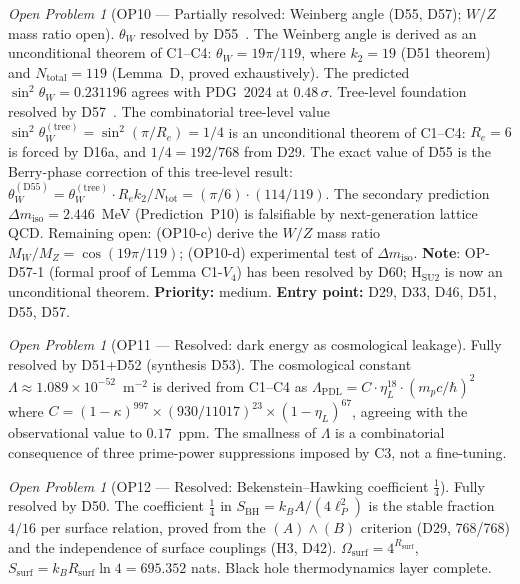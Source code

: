 \documentclass[11pt,a4paper]{article}
\theoremstyle{plain}
\theoremstyle{definition}
\theoremstyle{remark}
\newtheorem{openproblem}[theorem]{Open Problem}
\newcommand{\Rsurf}{R_{\mathrm{surf}}}
\newcommand{\SBH}{S_{\mathrm{BH}}}
\begin{document}
\begin{openproblem}[OP10 --- Partially resolved: Weinberg angle (D55, D57); $W/Z$ mass ratio open]
\label{op:weak}
\textcolor{proofblue}{$\theta_W$ resolved by D55~\cite{D55}.} The Weinberg angle is derived as an unconditional theorem of C1--C4: $\theta_W = 19\pi/119$, where $k_2 = 19$ (D51 theorem) and $N_{\mathrm{total}} = 119$ (Lemma~D, proved exhaustively). The predicted $\sin^2\theta_W = 0.231196$ agrees with PDG~2024 at $0.48\,\sigma$. \textcolor{proofblue}{Tree-level foundation resolved by D57~\cite{D57}.} The combinatorial tree-level value $\sin^2\theta_W^{(\mathrm{tree})} = \sin^2(\pi/R_e) = 1/4$ is an unconditional theorem of C1--C4: $R_e = 6$ is forced by D16a, and $1/4 = 192/768$ from D29. The exact value of D55 is the Berry-phase correction of this tree-level result: $\theta_W^{(\mathrm{D55})} = \theta_W^{(\mathrm{tree})} \cdot R_e k_2/N_{\mathrm{tot}} = (\pi/6)\cdot(114/119)$. The secondary prediction $\Delta m_{\mathrm{iso}} = 2.446$~MeV (Prediction~P10) is falsifiable by next-generation lattice QCD. Remaining open: (OP10-c) derive the $W/Z$ mass ratio $M_W/M_Z = \cos(19\pi/119)$; (OP10-d) experimental test of $\Delta m_{\mathrm{iso}}$. \textbf{Note}: OP-D57-1 (formal proof of Lemma C1-$V_4$) has been resolved by D60; H$_{\mathrm{SU2}}$ is now an unconditional theorem. \textbf{Priority:} medium. \textbf{Entry point:} D29, D33, D46, D51, D55, D57.
\end{openproblem}

\begin{openproblem}[OP11 --- Resolved: dark energy as cosmological leakage]
\label{op:darkenergy}
\textcolor{proofblue}{Fully resolved by D51+D52 (synthesis D53).} The cosmological constant $\Lambda \approx 1.089 \times 10^{-52}$~m$^{-2}$ is derived from C1--C4 as $\Lambda_{\mathrm{PDL}} = C \cdot \eta_L^{18} \cdot (m_p c/\hbar)^2$ where $C = (1-\kappa)^{997} \times (930/11017)^{23} \times (1-\eta_L)^{67}$, agreeing with the observational value to $0.17$~ppm. The smallness of $\Lambda$ is a combinatorial consequence of three prime-power suppressions imposed by C3, not a fine-tuning.
\end{openproblem}

\begin{openproblem}[OP12 --- Resolved: Bekenstein--Hawking coefficient $\tfrac{1}{4}$]
\label{op:BHcoeff}
\textcolor{proofblue}{Fully resolved by D50.} The coefficient $\tfrac{1}{4}$ in $\SBH = k_B A/(4\ell_P^2)$ is the stable fraction $4/16$ per surface relation, proved from the $(A)\wedge(B)$ criterion (D29, 768/768) and the independence of surface couplings (H3, D42). $\Omega_{\mathrm{surf}} = 4^{\Rsurf}$, $S_{\mathrm{surf}} = k_B\Rsurf\ln 4 = 695.352$ nats. Black hole thermodynamics layer complete.
\end{openproblem}
\end{document}
